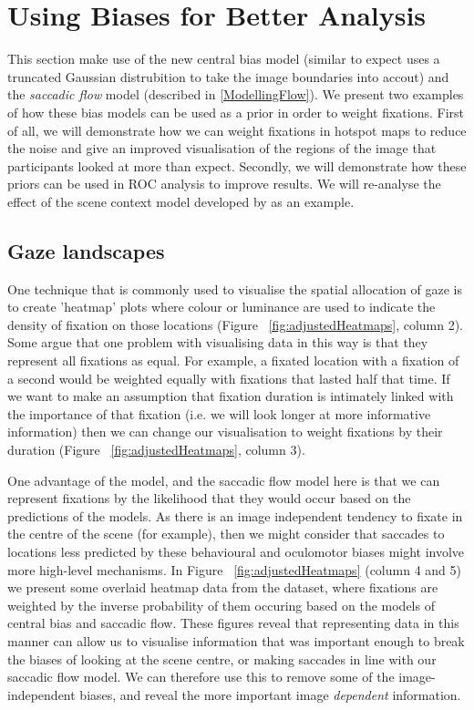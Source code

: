 \section{Using Biases for Better Analysis}

This section make use of the new central bias model (similar to \cite{clarke-tatler2014} expect uses a truncated Gaussian distrubition to take the image boundaries into accout) and the \textit{saccadic flow} model (described in \ref{ModellingFlow}). We present two examples of how these bias models can be used as a prior in order to weight fixations. First of all, we will demonstrate how we can weight fixations in hotspot maps to reduce the noise and give an improved visualisation of the regions of the image that participants looked at more than expect. Secondly, we will demonstrate how these priors can be used in ROC analysis to improve results. We will re-analyse the effect of the scene context model developed by  \cite{ehinger2009} as an example. 


\subsection{Gaze landscapes}

One technique that is commonly used to visualise the spatial allocation of gaze is to create 'heatmap' plots where colour or luminance are used to indicate the density of fixation on those locations (Figure ~\ref{fig:adjustedHeatmaps}, column 2). Some argue that one problem with visualising data in this way is that they represent all fixations as equal. For example, a fixated location with a fixation of a second would be weighted equally with fixations that lasted half that time. If we want to make an assumption that fixation duration is intimately linked with the importance of that fixation (i.e. we will look longer at more informative information) then we can change our visualisation to weight fixations by their duration (Figure ~\ref{fig:adjustedHeatmaps}, column 3).

One advantage of the \citep{clarke-tatler2014} model, and the saccadic flow model here is that we can represent fixations by the likelihood that they would occur based on the predictions of the models. As there is an image independent tendency to fixate in the centre of the scene (for example), then we might consider that saccades to locations less predicted by these behavioural and oculomotor biases might involve more high-level mechanisms. In Figure ~\ref{fig:adjustedHeatmaps} (column 4 and 5) we present some overlaid heatmap data from the \citep{clarke2013} dataset, where fixations are weighted by the inverse probability of them occuring based on the models of central bias and saccadic flow. These figures reveal that representing data in this manner can allow us to visualise information that was important enough to break the biases of looking at the scene centre, or making saccades in line with our saccadic flow model. We can therefore use this to remove some of the image-independent biases, and reveal the more important image \emph{dependent} information.

